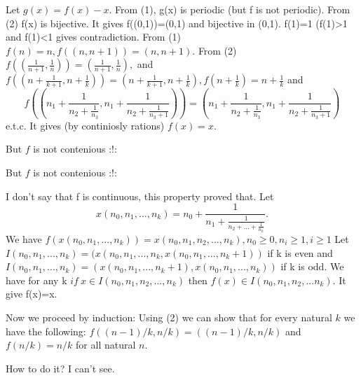 \begin{mysolution}
	Let $g(x)=f(x)-x$. From (1), g(x) is periodic (but f is not periodic).
From (2) f(x) is bijective. It gives f((0,1))=(0,1) and bijective in (0,1).
f(1)=1 (f(1)>1 and f(1)<1 gives contradiction. From (1) $f(n)=n, f((n,n+1))=(n,n+1)$. From (2) $f((\frac{1}{n+1},\frac{1}{n}))=(\frac{1}{n+1},\frac{1}{n}),$ and $f((n+\frac{1}{k+1},n+\frac{1}{k}))=(n+\frac{1}{k+1},n+\frac{1}{k}),f(n+\frac{1}{k})=n+\frac{1}{k}$ and \[f((n_{1}+\frac{1}{n_{2}+\frac{1}{n_{3}}},n_{1}+\frac{1}{n_{2}+\frac{1}{n_{3}+1}}))=(n_{1}+\frac{1}{n_{2}+\frac{1}{n_{3}}},n_{1}+\frac{1}{n_{2}+\frac{1}{n_{3}+1}})\] e.t.c. It gives (by continiosly rations) $f(x)=x$.
\end{mysolution}



\begin{mysolution}
	But $f$ is not contenious :!:
\end{mysolution}



\begin{mysolution}
	\begin{tcolorbox}But $f$ is not contenious :!:\end{tcolorbox}
I don't say that f is continuous, this property proved that.
Let \[x(n_{0},n_{1},...,n_{k})=n_{0}+\frac{1}{n_{1}+\frac{1}{n_{2}+...+\frac{1}{n_{k}}}}.\] We have $f(x(n_{0},n_{1},...,n_{k}))=x(n_{0},n_{1},n_{2},...,n_{k}),n_{0}\ge 0,n_{i}\ge 1,i\ge 1$
Let $I(n_{0},n_{1},...,n_{k})=(x(n_{0},n_{1},...,n_{k},x(n_{0},n_{1},...,n_{k}+1))$ if k is even and $I(n_{0},n_{1},...,n_{k})=(x(n_{0},n_{1},...,n_{k}+1),x(n_{0},n_{1},...,n_{k}))$ if k is odd.
We have for any k
$if \ x\in I(n_{0},n_{1},n_{2},...,n_{k})$ then $f(x)\in I(n_{0},n_{1},n_{2},...n_{k})$. 
It give f(x)=x.
\end{mysolution}



\begin{mysolution}
	\begin{tcolorbox}
Now we proceed by induction: 
Using (2) we can show that for every natural $k$ we have the following: 
$f( (n-1)/k,n/k ) = ((n-1)/k,n/k)$ and $f(n/k)=n/k$ for all natural $n$.
\end{tcolorbox}

How to do it? I can't see.
\end{mysolution}



